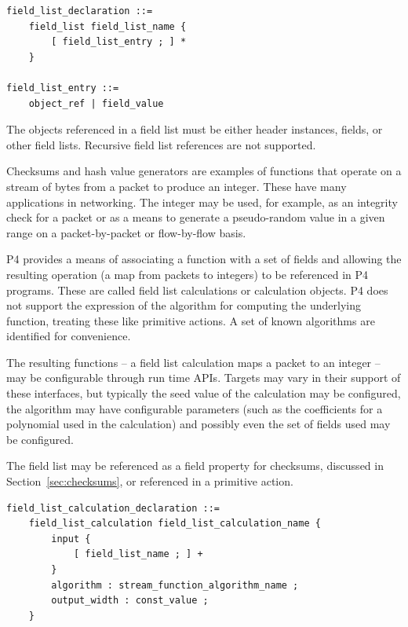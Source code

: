 \documentclass[12pt]{article}
\begin{document}
\begin{lstlisting}[style=BNFstyle]
field_list_declaration ::=
    field_list field_list_name {
        [ field_list_entry ; ] *
    }

field_list_entry ::= 
    object_ref | field_value
\end{lstlisting}

The objects referenced in a field list must be either header instances,
fields, or other field lists. Recursive field list references are not
supported.


Checksums and hash value generators are examples of functions that operate on a
stream of bytes from a packet to produce an integer. These have many
applications in networking. The integer may be used, for example, as an
integrity check for a packet or as a means to generate a pseudo-random value in
a given range on a packet-by-packet or flow-by-flow basis.

P4 provides a means of associating a function with a set of fields and
allowing the resulting operation (a map from packets to integers) to
be referenced in P4 programs.  These are called field list
calculations or calculation objects.  P4 does not support the
expression of the algorithm for computing the underlying function,
treating these like primitive actions. A set of known algorithms are
identified for convenience.

The resulting functions -- a field list calculation maps a packet to
an integer -- may be configurable through run time APIs. Targets may
vary in their support of these interfaces, but typically the seed
value of the calculation may be configured, the algorithm may have
configurable parameters (such as the coefficients for a polynomial
used in the calculation) and possibly even the set of fields used may
be configured.

The field list may be referenced as a field property for checksums,
discussed in Section~\ref{sec:checksums}, or referenced in a primitive action.

\begin{lstlisting}[style=BNFstyle]
field_list_calculation_declaration ::=
    field_list_calculation field_list_calculation_name {
        input {
            [ field_list_name ; ] +
        }
        algorithm : stream_function_algorithm_name ;
        output_width : const_value ;
    }
\end{lstlisting}
\end{document}

